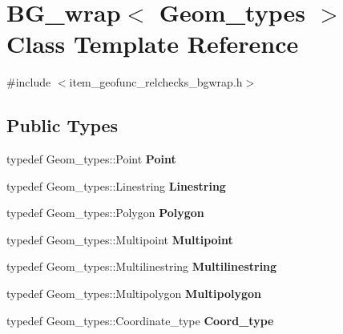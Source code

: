 \hypertarget{classBG__wrap}{}\section{B\+G\+\_\+wrap$<$ Geom\+\_\+types $>$ Class Template Reference}
\label{classBG__wrap}


{\ttfamily \#include $<$item\+\_\+geofunc\+\_\+relchecks\+\_\+bgwrap.\+h$>$}

\subsection*{Public Types}
\begin{DoxyCompactItemize}
\item 
\mbox{\label{classBG__wrap_aa85c4eb163f6a96d487566a45ecc05ab}} 
typedef Geom\+\_\+types\+::\+Point {\bfseries Point}
\item 
\mbox{\label{classBG__wrap_a8ff885a8527af98d536bb01ba647ef8a}} 
typedef Geom\+\_\+types\+::\+Linestring {\bfseries Linestring}
\item 
\mbox{\label{classBG__wrap_a37c1b34d4622df770934453ca8742bb9}} 
typedef Geom\+\_\+types\+::\+Polygon {\bfseries Polygon}
\item 
\mbox{\label{classBG__wrap_afd7cbabddd7bc5aee11ab28d17087855}} 
typedef Geom\+\_\+types\+::\+Multipoint {\bfseries Multipoint}
\item 
\mbox{\label{classBG__wrap_acaf466d19aa7ee1850dda97b86432352}} 
typedef Geom\+\_\+types\+::\+Multilinestring {\bfseries Multilinestring}
\item 
\mbox{\label{classBG__wrap_a5b450e15b73286775b0fd122bd3c7e95}} 
typedef Geom\+\_\+types\+::\+Multipolygon {\bfseries Multipolygon}
\item 
\mbox{\label{classBG__wrap_a58389470599b0814a0a712b7d4d0de90}} 
typedef Geom\+\_\+types\+::\+Coordinate\+\_\+type {\bfseries Coord\+\_\+type}
\item 
\mbox{\label{classBG__wrap_ab8a698d8d58d43ca47a91ec5856492fb}} 

\end{DoxyCompactItemize}
